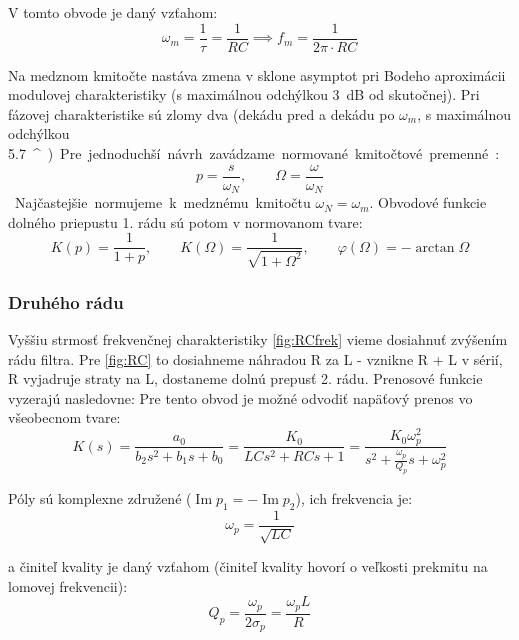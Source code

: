 V tomto obvode je daný vzťahom:
\begin{equation}
	\omega_m = \frac{1}{\tau} = \frac{1}{RC} \implies f_m = \frac{1}{2 \pi \cdot R C}
\end{equation}

Na medznom kmitočte nastáva zmena v sklone asymptot pri Bodeho aproximácii modulovej charakteristiky (s maximálnou odchýlkou \SI{3}{dB} od skutočnej). Pri fázovej charakteristike sú zlomy dva (dekádu pred a dekádu po $\omega_m$, s maximálnou odchýlkou \SI{5.7}{^\circ}).

Pre jednoduchší návrh zavádzame normované kmitočtové premenné:
\begin{equation}
	p = \frac{s}{\omega_N}, \qquad \Omega = \frac{\omega}{\omega_N}
\end{equation}

Najčastejšie normujeme k medznému kmitočtu $\omega_N = \omega_m$. Obvodové funkcie dolného priepustu 1. rádu sú potom v normovanom tvare:
\begin{equation}
	K(p) = \frac{1}{1 + p}, \qquad K(\Omega) = \frac{1}{\sqrt{1 + \Omega^2}}, \qquad \varphi(\Omega) = -\arctan\Omega
\end{equation}
\subsubsection{Druhého rádu}
Vyššiu strmosť frekvenčnej charakteristiky \ref{fig:RCfrek} vieme dosiahnuť zvýšením rádu filtra. Pre \ref{fig:RC} to dosiahneme náhradou R za L - vznikne R + L v sérií, R vyjadruje straty na L, dostaneme dolnú prepusť 2. rádu. Prenosové funkcie vyzerajú nasledovne:
Pre tento obvod je možné odvodiť napäťový prenos vo všeobecnom tvare:
\begin{equation}
	K(s) = \frac{a_0}{b_2 s^2 + b_1 s + b_0} = \frac{K_0}{LCs^2 + RCs + 1} = \frac{K_0 \omega_p^2}{s^2 + \frac{\omega_p}{Q_p} s + \omega_p^2}
\end{equation}

Póly sú komplexne združené ($\operatorname{Im} p_1 = -\operatorname{Im} p_2$), ich frekvencia je:
\begin{equation}
	\omega_p = \frac{1}{\sqrt{LC}}
\end{equation}

a činiteľ kvality je daný vzťahom (činiteľ kvality hovorí o veľkosti prekmitu na lomovej frekvencii):
\begin{equation}
	Q_p = \frac{\omega_p}{2\sigma_p} = \frac{\omega_p L}{R}
\end{equation}

